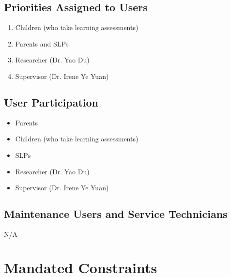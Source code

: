 \documentclass[12pt]{article}
\begin{document}
\subsection{Priorities Assigned to Users}
\begin{enumerate}
  \item Children (who take learning assessments)
  \item Parents and SLPs
  \item Researcher (Dr. Yao Du)
  \item Supervisor (Dr. Irene Ye Yuan)
\end{enumerate}
\subsection{User Participation}
\begin{itemize}
  \item Parents
  \item Children (who take learning assessments)
  \item SLPs
  \item Researcher (Dr. Yao Du)
  \item Supervisor (Dr. Irene Ye Yuan)
\end{itemize}

\subsection{Maintenance Users and Service Technicians}
N/A\\

\section{Mandated Constraints}
\end{document}
